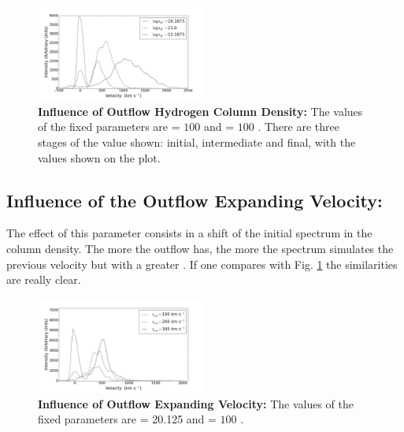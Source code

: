 \documentclass{latex/emulateapj}
\begin{document}
\begin{figure}[h!]
\begin{center}
  \includegraphics[width=0.5\textwidth]{./figures/inf_lognh_soft.png}
\end{center}
\caption{\textbf{Influence of Outflow Hydrogen Column Density:} The values of the fixed parameters are \vout = $100$ \kms and \vgal = $100$ \kms. There are three stages of the \lognh value shown: initial, intermediate and final, with the values shown on the plot.\\
\label{fig:influence_lognH}}
\end{figure}

\subsection{Influence of the Outflow Expanding Velocity: \vout }

The effect of this parameter consists in a shift of the initial spectrum in the column density. The more \vout the outflow has, the more the spectrum simulates the previous velocity but with a greater \lognh. If one compares with Fig. \ref{fig:influence_lognH} the similarities are really clear. \\

\begin{figure}[h!]
\begin{center}
  \includegraphics[width=0.5\textwidth]{./figures/inf_vout1_soft.png}
\end{center}
\caption{\textbf{Influence of Outflow Expanding Velocity:} The values of the fixed parameters are \lognh = 20.125 and \vgal = $100$ \kms.\\
\label{fig:influence_vout1}}
\end{figure}
\end{document}
